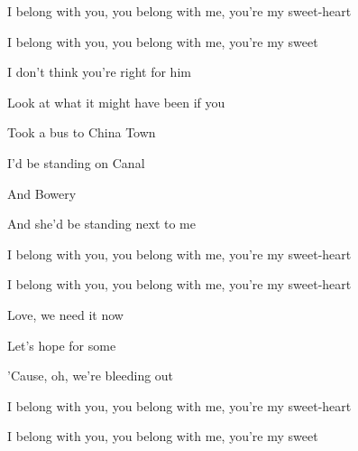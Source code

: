 \begin{song}
\bigskip

I belong with you, you belong with me, you're my sweet-heart \par
I belong with you, you belong with me, you're my sweet \par

\bigskip

    \par
{}    \par

\bigskip

 I don't think you're right for him  \par
{} Look at what it might have been if you  \par
{} Took a bus to China Town  \par
{} I'd be standing on Canal  \par
{} And Bowery  \par
{} And she'd be standing next to me  \par

\bigskip

I belong with you, you belong with me, you're my sweet-heart \par
I belong with you, you belong with me, you're my sweet-heart \par

\bigskip

Love, we need it now \par
Let's hope for some \par
'Cause, oh, we're bleeding out \par

\bigskip

I belong with you, you belong with me, you're my sweet-heart \par
I belong with you, you belong with me, you're my sweet \par

\bigskip

    \par
{}   \par

\end{song}

